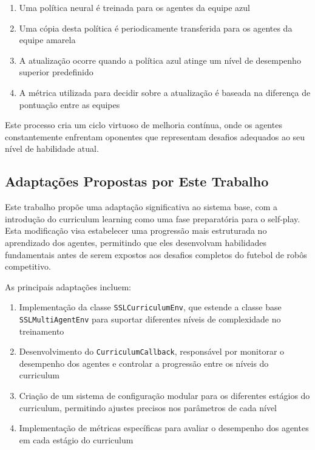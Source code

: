 \begin{enumerate}
    \item Uma política neural é treinada para os agentes da equipe azul
    \item Uma cópia desta política é periodicamente transferida para os agentes da equipe amarela
    \item A atualização ocorre quando a política azul atinge um nível de desempenho superior predefinido
    \item A métrica utilizada para decidir sobre a atualização é baseada na diferença de pontuação entre as equipes
\end{enumerate}

Este processo cria um ciclo virtuoso de melhoria contínua, onde os agentes constantemente enfrentam oponentes que representam desafios adequados ao seu nível de habilidade atual.

\subsection{Adaptações Propostas por Este Trabalho}

Este trabalho propõe uma adaptação significativa ao sistema base, com a introdução do curriculum learning como uma fase preparatória para o self-play. Esta modificação visa estabelecer uma progressão mais estruturada no aprendizado dos agentes, permitindo que eles desenvolvam habilidades fundamentais antes de serem expostos aos desafios completos do futebol de robôs competitivo.

As principais adaptações incluem:

\begin{enumerate}
    \item Implementação da classe \texttt{SSLCurriculumEnv}, que estende a classe base \texttt{SSLMultiAgentEnv} para suportar diferentes níveis de complexidade no treinamento
    
    \item Desenvolvimento do \texttt{CurriculumCallback}, responsável por monitorar o desempenho dos agentes e controlar a progressão entre os níveis do curriculum
    
    \item Criação de um sistema de configuração modular para os diferentes estágios do curriculum, permitindo ajustes precisos nos parâmetros de cada nível
    
    \item Implementação de métricas específicas para avaliar o desempenho dos agentes em cada estágio do curriculum
\end{enumerate}

